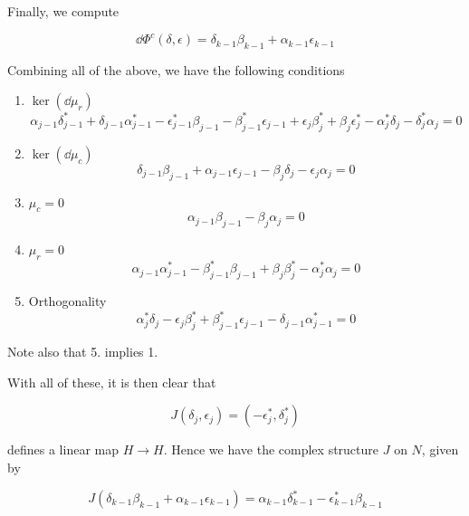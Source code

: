 \documentclass{article}
\begin{document}
Finally, we compute

\[\dd\Phi^c(\delta, \epsilon) = \delta_{k-1}\beta_{k-1} + \alpha_{k-1}\epsilon_{k-1}\]

Combining all of the above, we have the following conditions

\begin{enumerate}
    \item \(\ker(\dd\mu_r)\) \[\alpha_{j-1}\delta_{j-1}^* + \delta_{j-1}\alpha_{j-1}^* - \epsilon_{j-1}^*\beta_{j-1} - \beta_{j-1}^*\epsilon_{j-1} + \epsilon_j\beta_j^* + \beta_j\epsilon_j^* - \alpha_j^*\delta_j - \delta_j^*\alpha_j = 0\]
    \item \(\ker(\dd\mu_c)\) \[\delta_{j-1}\beta_{j-1} + \alpha_{j-1}\epsilon_{j-1} - \beta_j\delta_j - \epsilon_j\alpha_j = 0\]
    \item \(\mu_c = 0\) \[\alpha_{j-1}\beta_{j-1} - \beta_j\alpha_j = 0\]
    \item \(\mu_r = 0\) \[\alpha_{j-1}\alpha_{j-1}^* - \beta_{j-1}^*\beta_{j-1}+\beta_j\beta_j^* - \alpha_j^*\alpha_j = 0\]
    \item Orthogonality \[\alpha_j^*\delta_j - \epsilon_j\beta_j^* + \beta_{j-1}^*\epsilon_{j-1} - \delta_{j-1}\alpha_{j-1}^* = 0\]
\end{enumerate}

Note also that 5. implies 1.

With all of these, it is then clear that

\[J(\delta_j, \epsilon_j) = (-\epsilon_j^*, \delta_j^*)\]

defines a linear map \(H \to H\). Hence we have the complex structure \(J\) on \(N\), given by

\[J(\delta_{k-1}\beta_{k-1} + \alpha_{k-1}\epsilon_{k-1}) = \alpha_{k-1}\delta_{k-1}^* - \epsilon_{k-1}^*\beta_{k-1}\]

\printbibliography
\end{document}
